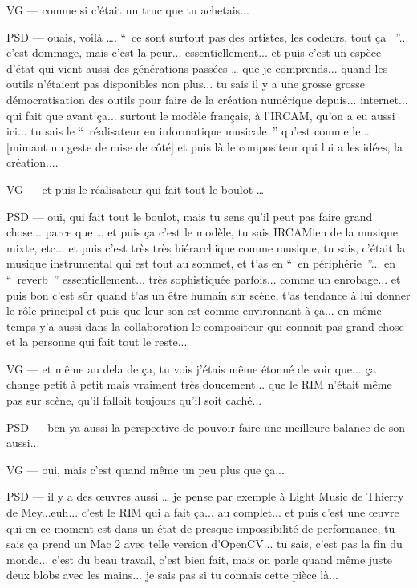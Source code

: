 VG — comme si c'était un truc que tu achetais... 

PSD — ouais, voilà …. “ ce sont surtout pas des artistes, les codeurs, tout ça  ”... c'est dommage, mais c'est la peur... essentiellement... et puis c'est un espèce d'état qui vient aussi des générations passées … que je comprends... quand les outils n'étaient pas disponibles non plus... tu sais il y a une grosse grosse démocratisation des outils pour faire de la création numérique depuis... internet... qui fait que avant ça... surtout le modèle français, à l'IRCAM, qu'on a eu aussi ici... tu sais le “ réalisateur en informatique musicale ” qu'est comme le … [mimant un geste de mise de côté] et puis là le compositeur qui lui a les idées, la création.... 

VG — et puis le réalisateur qui fait tout le boulot … 

PSD — oui, qui fait tout le boulot, mais tu sens qu'il peut pas faire grand chose... parce que … et puis ça c'est le modèle, tu sais IRCAMien de la musique mixte, etc... et puis c'est très très hiérarchique comme musique, tu sais, c'était la musique instrumental qui est tout au sommet, et t'as en “ en périphérie ”... en “ reverb ” essentiellement... très sophistiquée parfois... comme un enrobage... et puis bon c'est sûr quand t'as un être humain sur scène, t'as tendance à lui donner le rôle principal et puis que leur son est comme environnant à ça... en même temps y'a aussi dans la collaboration le compositeur qui connait pas grand chose et la personne qui fait tout le reste... 

VG — et même au dela de ça, tu vois j'étais même étonné de voir que... ça change petit à petit mais vraiment très doucement... que le RIM n'était même pas sur scène, qu'il fallait toujours qu'il soit caché... 

PSD — ben ya aussi la perspective de pouvoir faire une meilleure balance de son aussi... 

VG — oui, mais c'est quand même un peu plus que ça... 

PSD — il y a des œuvres aussi … je pense par exemple à Light Music de Thierry de Mey...euh... c'est le RIM qui a fait ça... au complet... et puis c'est une œuvre qui en ce moment est dans un état de presque impossibilité de performance, tu sais ça prend un Mac 2 avec telle version d'OpenCV... tu sais, c'est pas la fin du monde... c'est du beau travail, c'est bien fait, mais on parle quand même juste deux blobs avec les mains... je sais pas si tu connais cette pièce là... 

